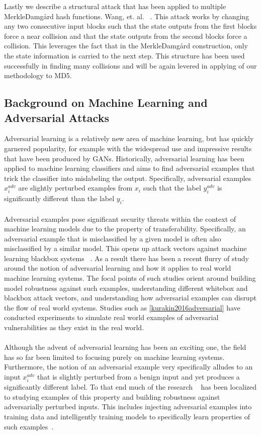 \documentclass[letterpaper,twocolumn,10pt]{article}
\begin{document}
\noindent Lastly we describe a structural attack that has been applied to multiple Merkle{\textendash}Damg\r{a}rd hash functions. Wang, et. al. ~\cite{wang2005break}. This attack works by changing any two consecutive input blocks such that the state outputs from the first blocks force a near collision and that the state outputs from the second blocks force a collision. This leverages the fact that in the Merkle{\textendash}Damg\r{a}rd construction, only the state information is carried to the next step. This structure has been used successfully in finding many collisions and will be again levered in applying of our methodology to MD5. 

\subsection{Background on Machine Learning and Adversarial Attacks} 
Adversarial learning is a relatively new area of machine learning, but has quickly garnered popularity, for example with the widespread use and impressive results that have been produced by GANs. Historically, adversarial learning has been applied to machine learning classifiers and aims to find adversarial examples that trick the classifier into mislabeling the output. Specifically, adversarial examples $x^{adv}_{i}$ are slightly perturbed examples from $x_{i}$ such that the label $y^{adv}_{i}$ is significantly different than the label $y_{i}$. 
\\
\\
Adversarial examples pose significant security threats within the context of machine learning models due to the property of transferability. Specifically, an adversarial example that is misclassified by a given model is often also misclassified by a similar model. This opens up attack vectors against machine learning blackbox systems ~\cite{papernot2017practical}. As a result there has been a recent flurry of study around the notion of adversarial learning and how it applies to real world machine learning systems. The focal points of such studies orient around building model robustness against such examples, understanding different whitebox and blackbox attack vectors, and understanding how adversarial examples can disrupt the flow of real world systems. Studies such as \ref{kurakin2016adversarial} have conducted experiments to simulate real world examples of adversarial vulnerabilities as they exist in the real world. 
\\
\\
Although the advent of adversarial learning has been an exciting one, the field has so far been limited to focusing purely on machine learning systems. Furthermore, the notion of an adversarial example very specifically alludes to an input $x^{adv}_{i}$ that is slightly perturbed from a benign input and yet produces a significantly different label. To that end much of the research ~\cite{su2019one, tramer2017ensemble, athalye2018obfuscated} has been localized to studying examples of this property and building robustness against adversarially perturbed inputs. This includes injecting adversarial examples into training data and intelligently training models to specifically learn properties of such examples~\cite{huang2011adversarial}.
\end{document}
